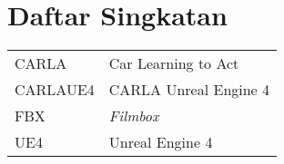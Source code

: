 \chapter*{Daftar Singkatan}

\begingroup
\def\arraystretch{1.25}
\begin{tabular}{p{} p{}}

	CARLA & Car Learning to Act \\
	CARLAUE4 & CARLA Unreal Engine 4 \\
	FBX & \textit{Filmbox} \\
	UE4 & Unreal Engine 4 \\

\end{tabular}
\endgroup
\clearpage

